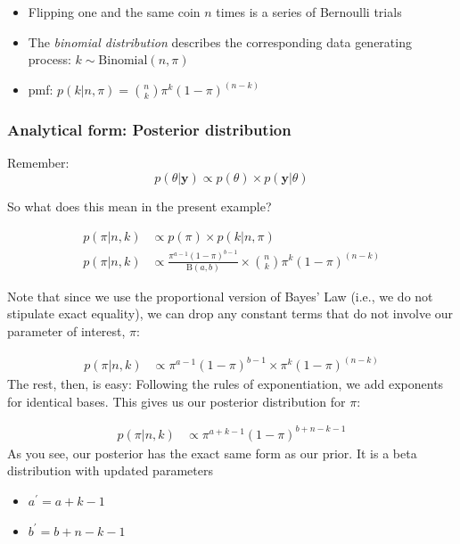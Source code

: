 \documentclass[
  11pt,
]{article}
\providecommand{\tightlist}{%
  \setlength{\itemsep}{0pt}\setlength{\parskip}{0pt}}
\begin{document}
\begin{itemize}
\tightlist
\item
  Flipping one and the same coin \(n\) times is a series of Bernoulli
  trials
\item
  The \emph{binomial distribution} describes the corresponding data
  generating process: \(k \sim \text{Binomial}(n, \pi)\)
\item
  pmf: \(p(k|n, \pi) = {n \choose k} \pi^k (1-\pi)^{(n-k)}\)
\end{itemize}

\hypertarget{analytical-form-posterior-distribution}{%
\subsubsection{Analytical form: Posterior distribution}\label{analytical-form-posterior-distribution}}

Remember:
\[p(\theta | \mathbf{y}) \propto p(\theta) \times p(\mathbf{y}|\theta)\]

So what does this mean in the present example?

\[\begin{split}p(\pi|n,k) & \propto p(\pi) \times p(k|n, \pi) \\
 p(\pi|n,k) & \propto \frac{\pi^{a-1} (1- \pi)^{b-1}}{\text{B}(a, b)} \times {n \choose k} \pi^k (1-\pi)^{(n-k)}\end{split}\]

Note that since we use the proportional version of Bayes' Law (i.e., we
do not stipulate exact equality), we can drop any constant terms that do
not involve our parameter of interest, \(\pi\):

\[\begin{split}p(\pi|n,k) & \propto \pi^{a-1} (1- \pi)^{b-1} \times \pi^k (1-\pi)^{(n-k)}\end{split}\]
The rest, then, is easy: Following the rules of exponentiation, we add
exponents for identical bases. This gives us our posterior distribution
for \(\pi\):

\[\begin{split}p(\pi|n,k) & \propto \pi^{a+k-1} (1- \pi)^{b+n-k-1}\end{split}\]
As you see, our posterior has the exact same form as our prior. It is a
beta distribution with updated parameters

\begin{itemize}
\tightlist
\item
  \(a^{\prime} = a+k-1\)
\item
  \(b^{\prime} = b+n-k-1\)
\end{itemize}
\end{document}
